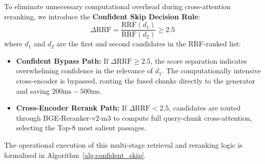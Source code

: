 \documentclass[10pt]{SPIIRAS_Proceedings}
\begin{document}
To eliminate unnecessary computational overhead during cross-attention reranking, we introduce the \textbf{Confident Skip Decision Rule}:
\begin{equation}
\Delta \text{RRF} = \frac{\text{RRF}(d_1)}{\text{RRF}(d_2)} \ge 2.5
\end{equation}
where $d_1$ and $d_2$ are the first and second candidates in the RRF-ranked list:
\begin{itemize}
    \item \textbf{Confident Bypass Path:} If $\Delta \text{RRF} \ge 2.5$, the score separation indicates overwhelming confidence in the relevance of $d_1$. The computationally intensive cross-encoder is bypassed, routing the fused chunks directly to the generator and saving $200\text{ms}-500\text{ms}$.
    \item \textbf{Cross-Encoder Rerank Path:} If $\Delta \text{RRF} < 2.5$, candidates are routed through BGE-Reranker-v2-m3 \cite{xiao2023cpack} to compute full query-chunk cross-attention, selecting the Top-8 most salient passages.
\end{itemize}

The operational execution of this multi-stage retrieval and reranking logic is formalized in Algorithm~\ref{alg:confident_skip}.
\end{document}
